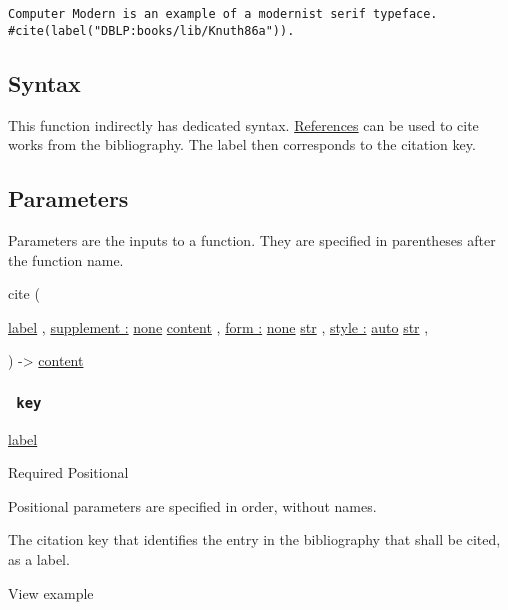 \begin{verbatim}
Computer Modern is an example of a modernist serif typeface.
#cite(label("DBLP:books/lib/Knuth86a")).
\end{verbatim}

\subsection{Syntax}\label{syntax}

This function indirectly has dedicated syntax.
\href{/docs/reference/model/ref/}{References} can be used to cite works
from the bibliography. The label then corresponds to the citation key.

\subsection{\texorpdfstring{{ Parameters
}}{ Parameters }}\label{parameters}

\label{parameters-tooltip}
Parameters are the inputs to a function. They are specified in
parentheses after the function name.

{ cite } (

{ \href{/docs/reference/foundations/label/}{label} , } {
\hyperref[parameters-supplement]{supplement :}
\href{/docs/reference/foundations/none/}{none}
\href{/docs/reference/foundations/content/}{content} , } {
\hyperref[parameters-form]{form :}
\href{/docs/reference/foundations/none/}{none}
\href{/docs/reference/foundations/str/}{str} , } {
\hyperref[parameters-style]{style :}
\href{/docs/reference/foundations/auto/}{auto}
\href{/docs/reference/foundations/str/}{str} , }

) -\textgreater{} \href{/docs/reference/foundations/content/}{content}

\subsubsection{\texorpdfstring{\texttt{\ key\ }}{ key }}\label{parameters-key}

\href{/docs/reference/foundations/label/}{label}

{Required} {{ Positional }}

\label{parameters-key-positional-tooltip}
Positional parameters are specified in order, without names.

The citation key that identifies the entry in the bibliography that
shall be cited, as a label.


View example

